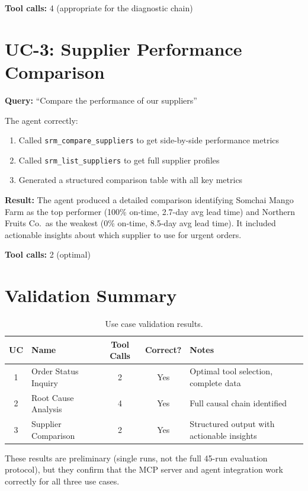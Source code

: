 \documentclass[12pt,a4paper]{report}
\begin{document}
\textbf{Tool calls:} 4 (appropriate for the diagnostic chain)

\section{UC-3: Supplier Performance Comparison}

\textbf{Query:} ``Compare the performance of our suppliers''

The agent correctly:
\begin{enumerate}[itemsep=0.2em]
    \item Called \texttt{srm\_compare\_suppliers} to get side-by-side performance metrics
    \item Called \texttt{srm\_list\_suppliers} to get full supplier profiles
    \item Generated a structured comparison table with all key metrics
\end{enumerate}

\textbf{Result:} The agent produced a detailed comparison identifying Somchai Mango Farm as the top performer (100\% on-time, 2.7-day avg lead time) and Northern Fruits Co.\ as the weakest (0\% on-time, 8.5-day avg lead time). It included actionable insights about which supplier to use for urgent orders.

\textbf{Tool calls:} 2 (optimal)

\section{Validation Summary}

\begin{table}[H]
\centering\small
\caption{Use case validation results.}
\begin{tabularx}{\textwidth}{@{} c l c c l @{}}
\toprule
\textbf{UC} & \textbf{Name} & \textbf{Tool Calls} & \textbf{Correct?} & \textbf{Notes} \\
\midrule
1 & Order Status Inquiry     & 2 & Yes & Optimal tool selection, complete data \\
2 & Root Cause Analysis      & 4 & Yes & Full causal chain identified \\
3 & Supplier Comparison      & 2 & Yes & Structured output with actionable insights \\
\bottomrule
\end{tabularx}
\end{table}

These results are preliminary (single runs, not the full 45-run evaluation protocol), but they confirm that the MCP server and agent integration work correctly for all three use cases.
\end{document}

